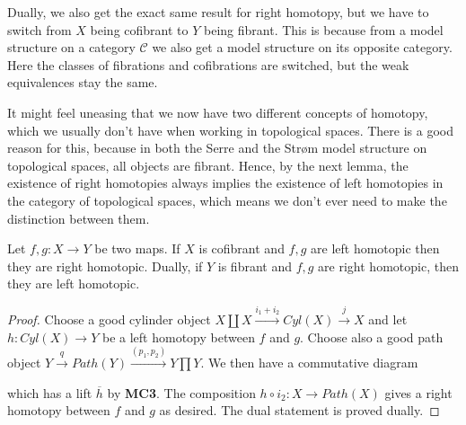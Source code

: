 Dually, we also get the exact same result for right homotopy, but we have to switch from $X$ being cofibrant to $Y$ being fibrant. This is because from a model structure on a category $\mathcal{C}$ we also get a model structure on its opposite category. Here the classes of fibrations and cofibrations are switched, but the weak equivalences stay the same. 

It might feel uneasing that we now have two different concepts of homotopy, which we usually don't have when working in topological spaces. There is a good reason for this, because in both the Serre and the Strøm model structure on topological spaces, all objects are fibrant. Hence, by the next lemma, the existence of right homotopies always implies the existence of left homotopies in the category of topological spaces, which means we don’t ever need to make the distinction between them.

\begin{lemma}
Let $f,g:X\longrightarrow Y$ be two maps. If $X$ is cofibrant and $f,g$ are left homotopic then they are right homotopic. Dually, if $Y$ is fibrant and $f,g$ are right homotopic, then they are left homotopic.
\end{lemma}
\begin{proof}
Choose a good cylinder object $X\coprod X \overset{i_1 + i_2}\longrightarrow Cyl(X) \overset{j}\longrightarrow X$ and let $h:Cyl(X)\longrightarrow Y$ be a left homotopy between $f$ and $g$. Choose also a good path object $Y\overset{q}\longrightarrow Path(Y) \overset{(p_1, p_2)}\longrightarrow Y\prod Y$. We then have a commutative diagram
\begin{center}
\end{center}
which has a lift $\overline{h}$ by \textbf{MC3}. 
The composition $h\circ i_2:X\longrightarrow Path(X)$ gives a right homotopy between $f$ and $g$ as desired. The dual statement is proved dually.
\end{proof}

